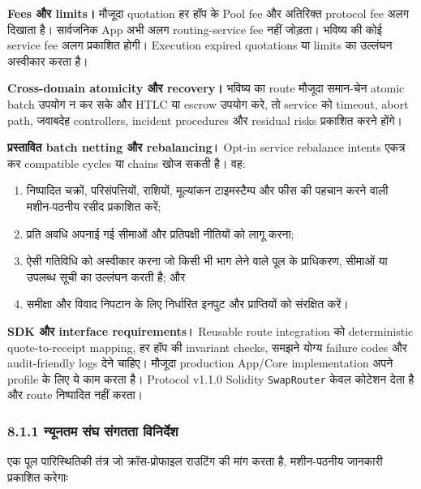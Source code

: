 \documentclass[11pt]{article}
\begin{document}
\textbf{Fees और limits।} मौजूदा quotation हर हॉप के Pool fee और अतिरिक्त protocol fee अलग दिखाता है। सार्वजनिक App अभी अलग routing-service fee नहीं जोड़ता। भविष्य की कोई service fee अलग प्रकाशित होगी। Execution expired quotations या limits का उल्लंघन अस्वीकार करता है।

\textbf{Cross-domain atomicity और recovery।} भविष्य का route मौजूदा समान-चेन atomic batch उपयोग न कर सके और HTLC या escrow उपयोग करे, तो service को timeout, abort path, जवाबदेह controllers, incident procedures और residual risks प्रकाशित करने होंगे।

\textbf{प्रस्तावित batch netting और rebalancing।} Opt-in service rebalance intents एकत्र कर compatible cycles या chains खोज सकती है। वह:

\begin{enumerate}[leftmargin=*]
\item निष्पादित चक्रों, परिसंपत्तियों, राशियों, मूल्यांकन टाइमस्टैम्प और फीस की पहचान करने वाली मशीन-पठनीय रसीद प्रकाशित करें;
\item प्रति अवधि अपनाई गई सीमाओं और प्रतिपक्षी नीतियों को लागू करना;
\item ऐसी गतिविधि को अस्वीकार करना जो किसी भी भाग लेने वाले पूल के प्राधिकरण, सीमाओं या उपलब्ध सूची का उल्लंघन करती है; और
\item समीक्षा और विवाद निपटान के लिए निर्धारित इनपुट और प्राप्तियों को संरक्षित करें।
\end{enumerate}
\textbf{SDK और interface requirements।} Reusable route integration को deterministic quote-to-receipt mapping, हर हॉप की invariant checks, समझने योग्य failure codes और audit-friendly logs देने चाहिए। मौजूदा production App/Core implementation अपने profile के लिए ये काम करता है। Protocol v1.1.0 Solidity \texttt{SwapRouter} केवल कोटेशन देता है और route निष्पादित नहीं करता।

\subsubsection*{8.1.1 न्यूनतम संघ संगतता विनिर्देश}

एक पूल पारिस्थितिकी तंत्र जो क्रॉस-प्रोफाइल राउटिंग की मांग करता है, मशीन-पठनीय जानकारी प्रकाशित करेगाः
\end{document}
